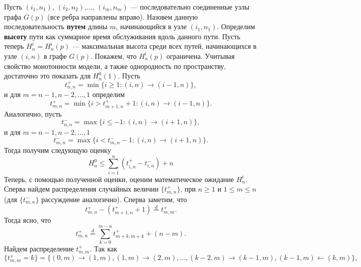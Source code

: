 \documentclass[10pt, reqno]{amsart}
\begin{document}
Пусть $(i_{1},n_{1})$, $(i_{2},n_{2})$,..., $(i_{m},n_{m})$ --- последовательно соединенные узлы графа $G(p)$ (все ребра направлены вправо). Назовем данную последовательность \textbf{путем} длины $m$, начинающийся в узле $(i_{1},n_{1})$. Определим \textbf{высоту} пути как суммарное время обслуживания вдоль данного пути. Пусть теперь $H^{i}_{n} = H^{i}_{n}(p)$ --- максимальная высота среди всех путей, начинающихся в узле $(i,n)$ в графе $G(p)$. Покажем, что $H^{i}_{n}(p)$ ограничена. Учитывая свойство монотонности модели, а также однородность по пространству, достаточно это показать для $H^{0}_{n}(1)$. Пусть
\begin{equation*}
    t^{+}_{n,n} = \min\{i \geq 1: (i,n) \xrightarrow{} (i-1,n)\},
\end{equation*}
и для $m = n-1, n-2,..., 1$ определим
\begin{equation*}
    t^{+}_{m,n} = \min\{i > t^{+}_{m+1,n} + 1: (i,n) \xrightarrow{} (i-1,n)\}.
\end{equation*}
Аналогично, пусть
\begin{equation*}
    t^{-}_{n,n} = \max\{i \leq -1: (i,n) \xrightarrow{} (i+1,n)\},
\end{equation*}
и для $m = n-1, n-2,..., 1$
\begin{equation*}
    t^{-}_{m,n} = \max\{i < t^{-}_{m,n} - 1: (i,n) \xrightarrow{} (i+1,n)\}.
\end{equation*}
Тогда получим следующую оценку
\begin{equation}
    H^{0}_{n} \leq \sum_{i=1}^{n}(t^{+}_{i,n} - t^{-}_{i,n}) + n
    \label{Height_rough_est}
\end{equation}
Теперь, с помощью полученной оценки, оценим математическое ожидание $H^{i}_{n}$. Сперва найдем распределения случайных величин $\{t^{+}_{m,n}\}$, при $n \geq 1$ и $1 \leq m \leq n$ (для $\{t^{-}_{m,n}\}$ рассуждение аналогично). Сперва заметим, что
\begin{equation*}
    t^{+}_{m,n} - (t^{+}_{m+1,n} + 1) \overset{d}{=} t^{+}_{m,m}.
\end{equation*}
Тогда ясно, что
\begin{equation*}
    t^{+}_{m,n} \overset{d}{=} \sum_{k=0}^{m-n}t^{+}_{m+k,m+k} + (n-m).
\end{equation*}
Найдем распределение $t^{+}_{m,m}$. Так как
\begin{equation*}
    \{t^{+}_{m,m} = k\} = \{(0,m) \xrightarrow{} (1,m), (1,m) \xrightarrow{} (2,m),..., (k-2,m) \xrightarrow{} (k-1,m), (k-1,m) \xleftarrow{} (k, m)\},
\end{equation*}
\end{document}
